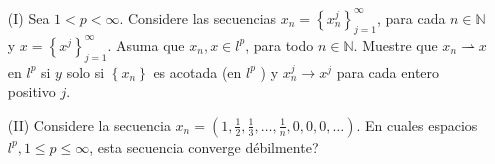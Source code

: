 \begin{itemize}
  \item[(I)] Sea $1<p<\infty$. Considere las secuencias $x_n=\left\{x_n^j\right\}_{j=1}^{\infty}$, para cada $n \in \mathbb{N}$ y $x=\left\{x^j\right\}_{j=1}^{\infty}$. Asuma que $x_n, x \in l^p$, para todo $n \in \mathbb{N}$.
  Muestre que $x_n \rightharpoonup x$ en $l^p$ si $y$ solo si $\left\{x_n\right\}$ es acotada (en $l^p$ ) y $ x_n^j \rightarrow x^j$ para cada entero positivo $j$.
  \item[(II)]  Considere la secuencia $x_n=\left(1, \frac{1}{2}, \frac{1}{3}, \ldots, \frac{1}{n}, 0,0,0, \ldots\right)$. En cuales espacios $l^p, 1 \leq p \leq \infty$, esta secuencia converge débilmente?
\end{itemize}




